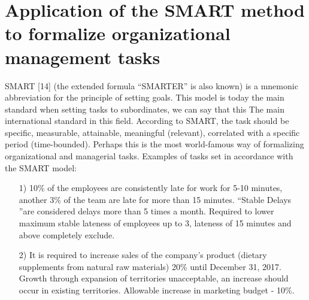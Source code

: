 \documentclass[11pt,a4paper]{book}
\begin{document}
\section[The SMART method]{Application of the SMART method to formalize
  organizational management tasks}

SMART [14] (the extended formula “SMARTER” is also known) is a mnemonic
abbreviation for the principle of setting goals. This model is today the main
standard when setting tasks to subordinates, we can say that this The main
international standard in this field. According to SMART, the task should be
specific, measurable, attainable, meaningful (relevant), correlated with a
specific period (time-bounded). Perhaps this is the most world-famous way of
formalizing organizational and managerial tasks.  Examples of tasks set in
accordance with the SMART model:
\begin{itemize}\it
\item [1)] 10\% of the employees are consistently late for work for 5-10
  minutes, another 3\% of the team are late for more than 15 minutes. “Stable
  Delays ”are considered delays more than 5 times a month. Required to lower
  maximum stable lateness of employees up to 3, lateness of 15 minutes and
  above completely exclude.
\item[2)] It is required to increase sales of the company's product (dietary
  supplements from natural raw materials) 20\% until December 31, 2017. Growth
  through expansion of territories unacceptable, an increase should occur in
  existing territories.  Allowable increase in marketing budget - 10\%.
\end{itemize}
\end{document}
